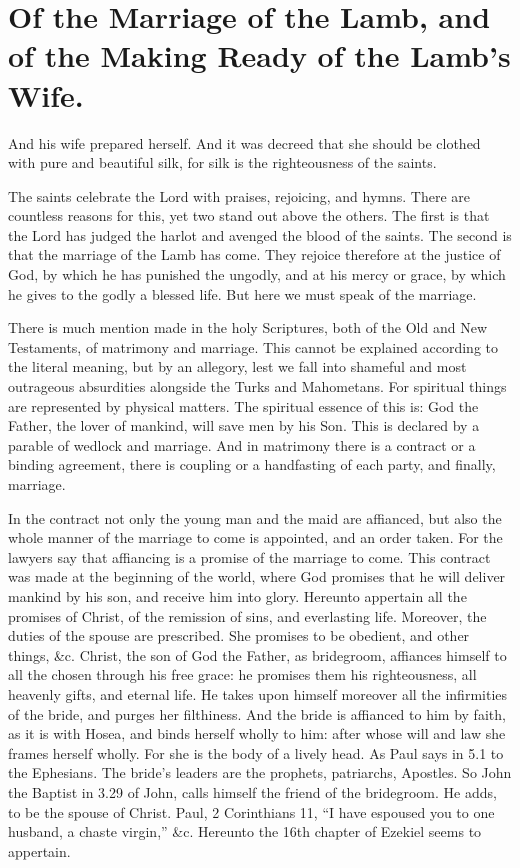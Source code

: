 \chapter[Sermon 82. Of the Marriage of the Lamb, and of the Making Ready of the Lamb's Wife.]{Of the Marriage of the Lamb, and of the Making Ready of the Lamb's Wife.}
\label{sermon:082}

And his wife prepared herself. And it was decreed that she should be clothed with pure and beautiful silk, for silk is the righteousness of the saints.

The saints celebrate the Lord with praises, rejoicing, and hymns. There are countless reasons for this, yet two stand out above the others. The first is that the Lord has judged the harlot and avenged the blood of the saints. The second is that the marriage of the Lamb has come. They rejoice therefore at the justice of God, by which he has punished the ungodly, and at his mercy or grace, by which he gives to the godly a blessed life. But here we must speak of the marriage.

There is much mention made in the holy Scriptures, both of the Old and New Testaments, of matrimony and marriage. This cannot be explained according to the literal meaning, but by an allegory, lest we fall into shameful and most outrageous absurdities alongside the Turks and Mahometans. For spiritual things are represented by physical matters. The spiritual essence of this is: God the Father, the lover of mankind, will save men by his Son. This is declared by a parable of wedlock and marriage. And in matrimony there is a contract or a binding agreement, there is coupling or a handfasting of each party, and finally, marriage.

In the contract not only the young man and the maid are affianced, but also the whole manner of the marriage to come is appointed, and an order taken. For the lawyers say that affiancing is a promise of the marriage to come. This contract was made at the beginning of the world, where God promises that he will deliver mankind by his son, and receive him into glory. Hereunto appertain all the promises of Christ, of the remission of sins, and everlasting life. Moreover, the duties of the spouse are prescribed. She promises to be obedient, and other things, \&c. Christ, the son of God the Father, as bridegroom, affiances himself to all the chosen through his free grace: he promises them his righteousness, all heavenly gifts, and eternal life. He takes upon himself moreover all the infirmities of the bride, and purges her filthiness. And the bride is affianced to him by faith, as it is with Hosea, and binds herself wholly to him: after whose will and law she frames herself wholly. For she is the body of a lively head. As Paul says in 5.1 to the Ephesians. The bride’s leaders are the prophets, patriarchs, Apostles. So John the Baptist in 3.29 of John, calls himself the friend of the bridegroom. He adds, to be the spouse of Christ. Paul, 2 Corinthians 11, “I have espoused you to one husband, a chaste virgin,” \&c. Hereunto the 16th chapter of Ezekiel seems to appertain.

